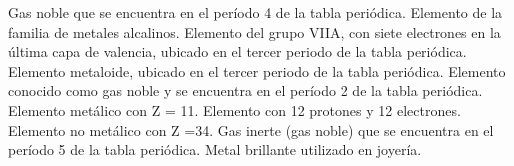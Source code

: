 \begin{minipage}{0.6\textwidth}\hfill
    \begin{choices}
        \choice Gas noble que se encuentra en el período 4 de la tabla periódica.
        \choice Elemento de la familia de metales alcalinos.
        \choice Elemento del grupo VIIA, con siete electrones en la última capa de valencia, ubicado en el tercer periodo de la tabla periódica.
        \choice Elemento metaloide, ubicado en el tercer periodo de la tabla periódica.
        \choice Elemento conocido como gas noble y se encuentra en el período 2 de la tabla periódica.
        \choice Elemento metálico con Z = 11.
        \choice Elemento con 12 protones y 12 electrones.
        \choice Elemento no metálico con Z =34.
        \choice Gas inerte (gas noble) que se encuentra en el período 5 de la tabla periódica.
        \choice Metal brillante utilizado en joyería.
    \end{choices}
\end{minipage}